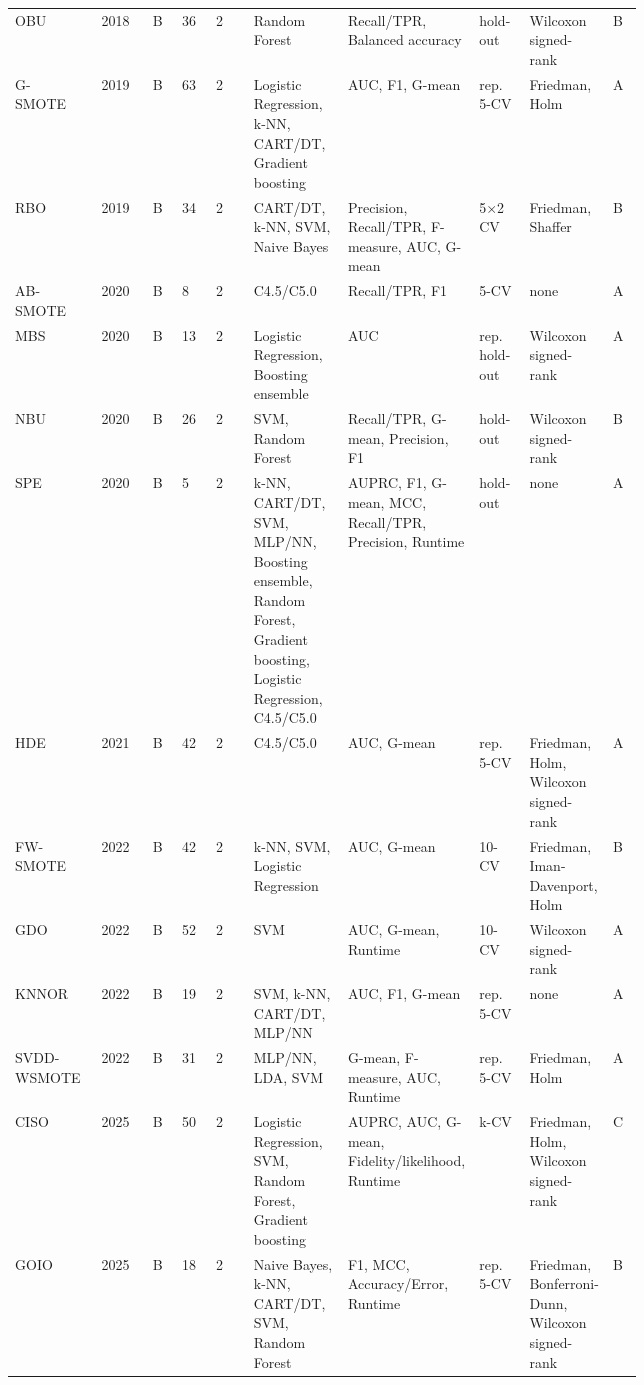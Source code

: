 \begin{longtable}{@{}p{0.13\linewidth}lllp{0.06\linewidth}p{0.15\linewidth}p{0.2\linewidth}p{0.08\linewidth}p{0.11\linewidth}l@{}}
OBU~\parencite{vuttipittayamongkol2018obu} & 2018 & B & 36 & 2 & Random Forest & Recall/TPR, Balanced accuracy & hold-out & Wilcoxon signed-rank & B\\
G-SMOTE~\parencite{douzas2019gsmote} & 2019 & B & 63 & 2 & Logistic Regression, k-NN, CART/DT, Gradient boosting & AUC, F1, G-mean & rep. 5-CV & Friedman, Holm & A\\
RBO~\parencite{koziarski2019rbo} & 2019 & B & 34 & 2 & CART/DT, k-NN, SVM, Naive Bayes & Precision, Recall/TPR, F-measure, AUC, G-mean & 5$\times$2 CV & Friedman, Shaffer & B\\
AB-SMOTE~\parencite{almajzoub2020absmote} & 2020 & B & 8 & 2 & C4.5/C5.0 & Recall/TPR, F1 & 5-CV & none & A\\
MBS~\parencite{liu2020mbs} & 2020 & B & 13 & 2 & Logistic Regression, Boosting ensemble & AUC & rep. hold-out & Wilcoxon signed-rank & A\\
NBU~\parencite{vuttipittayamongkol2020nbu} & 2020 & B & 26 & 2 & SVM, Random Forest & Recall/TPR, G-mean, Precision, F1 & hold-out & Wilcoxon signed-rank & B\\
SPE~\parencite{liu2020spe} & 2020 & B & 5 & 2 & k-NN, CART/DT, SVM, MLP/NN, Boosting ensemble, Random Forest, Gradient boosting, Logistic Regression, C4.5/C5.0 & AUPRC, F1, G-mean, MCC, Recall/TPR, Precision, Runtime & hold-out & none & A\\
HDE~\parencite{chen2021hde} & 2021 & B & 42 & 2 & C4.5/C5.0 & AUC, G-mean & rep. 5-CV & Friedman, Holm, Wilcoxon signed-rank & A\\
FW-SMOTE~\parencite{maldonado2022fwsmote} & 2022 & B & 42 & 2 & k-NN, SVM, Logistic Regression & AUC, G-mean & 10-CV & Friedman, Iman-Davenport, Holm & B\\
GDO~\parencite{xie2022gdo} & 2022 & B & 52 & 2 & SVM & AUC, G-mean, Runtime & 10-CV & Wilcoxon signed-rank & A\\
KNNOR~\parencite{islam2022knnor} & 2022 & B & 19 & 2 & SVM, k-NN, CART/DT, MLP/NN & AUC, F1, G-mean & rep. 5-CV & none & A\\
SVDD-WSMOTE~\parencite{tao2022svddw} & 2022 & B & 31 & 2 & MLP/NN, LDA, SVM & G-mean, F-measure, AUC, Runtime & rep. 5-CV & Friedman, Holm & A\\
CISO~\parencite{yadav2025ciso} & 2025 & B & 50 & 2 & Logistic Regression, SVM, Random Forest, Gradient boosting & AUPRC, AUC, G-mean, Fidelity/likelihood, Runtime & k-CV & Friedman, Holm, Wilcoxon signed-rank & C\\
GOIO~\parencite{ren2025goio} & 2025 & B & 18 & 2 & Naive Bayes, k-NN, CART/DT, SVM, Random Forest & F1, MCC, Accuracy/Error, Runtime & rep. 5-CV & Friedman, Bonferroni-Dunn, Wilcoxon signed-rank & B\\

\end{longtable}
